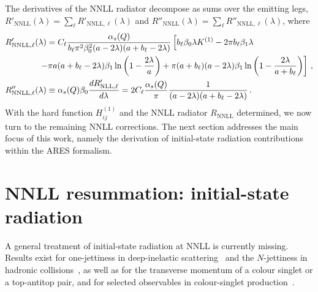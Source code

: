 The derivatives of the NNLL radiator decompose as sums over the
emitting legs, $R'_{\mathrm{NNLL}}(\lambda)=\sum_\ell R'_{\mathrm{NNLL},\ell}(\lambda)$
and $R''_{\mathrm{NNLL}}(\lambda)=\sum_\ell R''_{\mathrm{NNLL},\ell}(\lambda)$, where
\begin{subequations}
\begin{align}
 \label{eq:RNNLL}
	&R'_{\mathrm{NNLL},\ell}(\lambda)=C_{\ell}\frac{\alpha_s(Q)}{b_{\ell}\pi^2\beta_0^2(a-2\lambda)(a+b_{\ell}-2\lambda)}
		\left[b_{\ell}\beta_0\lambda K^{(1)}-2\pi b_{\ell}\beta_1\lambda \right. \notag\\ 
		& \qquad\qquad \left.-\pi a(a+b_{\ell}-2\lambda)\beta_1\ln\left(1-\frac{2\lambda}{a}\right)+\pi(a+b_{\ell})(a-2\lambda)\beta_1\ln\left(1-\frac{2\lambda}{a+b_{\ell}}\right)\right]\,,
	 \\ \label{eq:R2NNLL}
	&R''_{\mathrm{NNLL},\ell}(\lambda)\equiv \alpha_s(Q)\beta_0\frac{dR'_{\mathrm{NLL},\ell}}{d\lambda}=2C_{\ell}\frac{\alpha_s(Q)}{\pi}\frac{1}{(a-2\lambda)(a+b_{\ell}-2\lambda)}\,.
	\end{align}
\end{subequations}
With the hard function $H^{(1)}_{ij}$ and the NNLL radiator
$R_{\mathrm{NNLL}}$ determined, we now turn to the remaining NNLL
corrections. The next section addresses the main focus of this work,
namely the derivation of initial-state radiation contributions within
the \textsc{ARES} formalism.

\section{NNLL resummation: initial-state radiation}
\label{sec:NNLL-initial}

A general treatment of initial-state radiation at NNLL is currently
missing. Results exist for one-jettiness in deep-inelastic scattering~\cite{Kang:2013ata, Kang:2013lga}
and the $N$-jettiness in hadronic collisions~\cite{Stewart:2010tn, Gaunt:2015pea}, as well as
for the transverse momentum of a colour singlet or a top-antitop pair,
and for selected observables in colour-singlet
production~\cite{vanBeekveld:2025zjh}.

